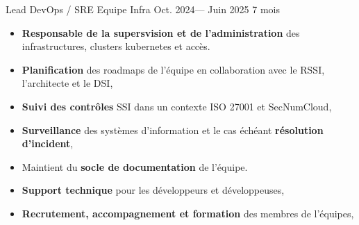 \jobposition%
{Lead DevOps / SRE}%
{Equipe Infra}%
{Oct. 2024--- Juin 2025}%
{7 mois}%
{
	\begin{itemize}
		\item \textbf{Responsable de la supersvision et de l'administration} des
		      infrastructures, clusters kubernetes et accès.
		\item \textbf{Planification} des roadmaps de l'équipe en collaboration avec
		      le RSSI, l'architecte et le DSI,
		\item \textbf{Suivi des contrôles} SSI dans un contexte ISO 27001 et SecNumCloud,
		\item \textbf{Surveillance} des systèmes d'information et le cas échéant
		      \textbf{résolution d'incident},
		\item Maintient du \textbf{socle de documentation} de l'équipe.
		\item \textbf{Support technique} pour les développeurs et développeuses,
		\item \textbf{Recrutement, accompagnement et formation} des membres de
		      l'équipes,
	\end{itemize}


}
